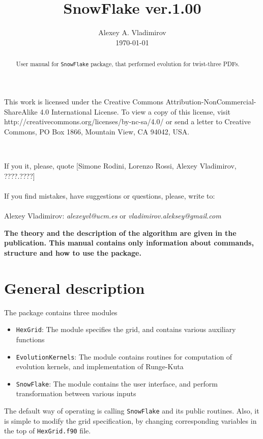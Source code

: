 \documentclass[prd,nofootinbib,eqsecnum,final]{revtex4}
\renewcommand{\(}{\left(}
\renewcommand{\)}{\right)}
\renewcommand{\[}{\left[}
\renewcommand{\]}{\right]}
\newcommand{\red}[1]{{\color[rgb]{1,0,0} #1}}
\begin{document}
\title{SnowFlake ver.1.00}
\author{Alexey A. Vladimirov \\ \today}
\noaffiliation
\begin{abstract}
User manual for \texttt{SnowFlake} package, that performed evolution for twist-three PDFs.
\center{\red{\textbf{Manual is updating.}}}
\end{abstract}
\maketitle

\begin{tcolorbox}
\begin{center}
This work is licensed under the Creative Commons Attribution-NonCommercial-ShareAlike 4.0 International License. To view a copy of this license, visit http://creativecommons.org/licenses/by-nc-sa/4.0/ or send a letter to Creative Commons, PO Box 1866, Mountain View, CA 94042, USA.

~

If you it, please, quote [Simone Rodini, Lorenzo Rossi, Alexey Vladimirov, ????.????]
\\
~
\\
If you find mistakes, have suggestions or questions, please, write to: 
\\
~
\\
Alexey Vladimirov: \textit{alexeyvl@ucm.es} or \textit{vladimirov.aleksey@gmail.com}
\end{center}
\end{tcolorbox}

\begin{center}
\textbf{The theory and the description of the algorithm are given in the publication. This manual contains only information about commands, structure and how to use the package.}
\end{center}

\section{General description}

The package contains three modules
\begin{itemize}
\item \texttt{HexGrid}: The module specifies the grid, and contains various auxiliary functions
\item \texttt{EvolutionKernels}: The module contains routines for computation of evolution kernels, and implementation of Runge-Kuta
\item \texttt{SnowFlake}: The module contains the user interface, and perform transformation between various inputs
\end{itemize}
The default way of operating is calling \texttt{SnowFlake} and its public routines. Also, it is simple to modify the grid specification, by changing corresponding variables in the top of \texttt{HexGrid.f90} file.
\end{document}

